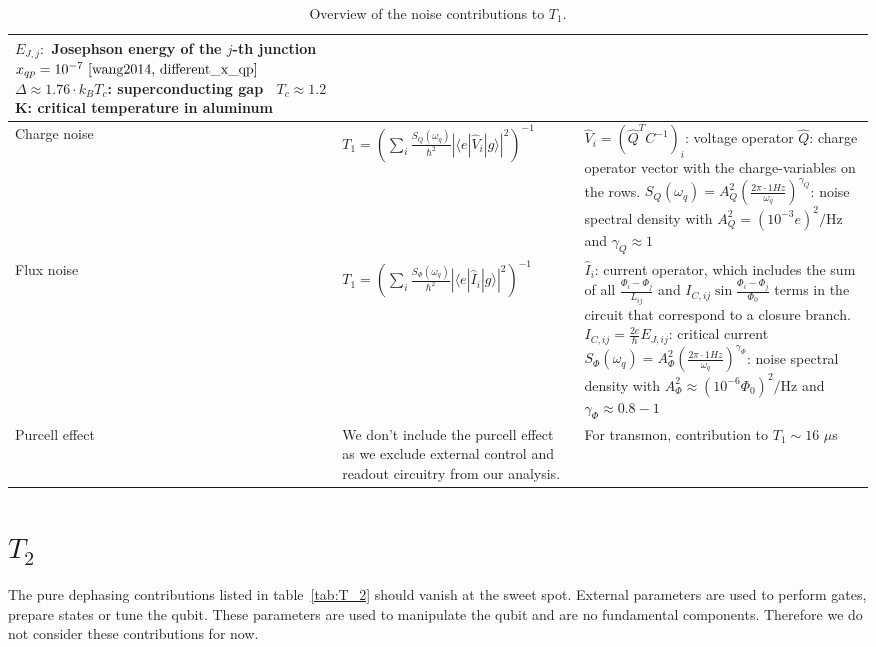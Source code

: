 \documentclass[]{article}
\newcommand{\ket}[1]{| #1 \rangle}
\newcommand{\bra}[1]{\langle #1 |}
\begin{document}
\begin{table}[h]
\begin{tabular}{|p{2cm}|p{5.7cm}|p{7.5cm}|}
$E_{J,j}:$ Josephson energy of the $j$-th junction \newline
$x_{qp}= 10^{-7}~\cite{wang2014, different_x_qp}$ \newline
$\Delta\approx 1.76 \cdot k_B T_c$: superconducting gap~\cite{gap} \newline
$T_c \approx 1.2$ K: critical temperature in aluminum~\cite{T_c} \\
\hline 
Charge noise & $T_1 = \left( \sum_{i} \frac{S_{Q}(\omega_q)}{\hbar^2} \left| \bra{e} \hat{V}_i \ket{g} \right|^{2} \right) ^{-1}$~\cite{yan2016}
& $\hat{V}_i=\left(\hat{Q}^T C^{-1} \right)_i$: voltage operator \newline 
$\hat{Q}$: charge operator vector with the charge-variables on the rows.\newline
$S_{Q}(\omega_q)=A_Q^2\left( \frac{2\pi \cdot 1 Hz}{\omega_q} \right)^{\gamma_Q}$: noise spectral density with $A_Q^2=(10^{-3}e)^2/$Hz and $\gamma_Q\approx1$~\cite{krantz2019} \\
\hline
Flux noise & $T_1 =  \left( \sum_{i} \frac{S_{\Phi}(\omega_q)}{\hbar^2} \left| \bra{e} \hat{I}_i \ket{g} \right|^{2} \right)^{-1}$~\cite{yan2016}
& $\hat{I}_i$: current operator, which includes the sum of all $\frac{\Phi_i-\Phi_j}{L_{ij}}$ and $I_{C, ij}  \sin \frac{\Phi_i-\Phi_j}{\Phi_0}$ terms in the circuit that correspond to a closure branch. \newline 
$I_{C, ij} = \frac{2e}{\hbar}  E_{J, ij}$: critical current \newline
$S_{\Phi}(\omega_q)=A_{\Phi}^2\left( \frac{2\pi \cdot 1 Hz}{\omega_q} \right)^{\gamma_{\Phi}}$: noise spectral density with $A_{\Phi}^2\approx(10^{-6} \Phi_0)^2/$Hz and $\gamma_{\Phi} \approx 0.8 - 1$~\cite{krantz2019} \\
\hline
Purcell effect & We don't include the purcell effect as we exclude external control and readout circuitry from our analysis. 
& For transmon, contribution to  $T_1 \sim 16$ $\mu$s~\cite{koch2007}  \\
\hline

\end{tabular} 
\caption{Overview of the noise contributions to $T_1$.}
\label{tab:T_1}
\end{table}


\section{$T_2$}
The pure dephasing contributions listed in table~\ref{tab:T_2} should vanish at the sweet spot. External parameters are used to perform gates, prepare states or tune the qubit. These parameters are used to manipulate the qubit and are no fundamental components. Therefore we do not consider these contributions for now.
\end{document}
